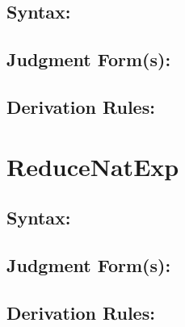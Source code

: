 \documentclass[11pt]{jarticle}
\begin{document}
\subsection*{Syntax:}

\EvalNatExpDisplayBNF

\subsection*{Judgment Form(s):}


\subsection*{Derivation Rules:}
\EvalNatExpDisplayRules

\newpage

\section*{ReduceNatExp}



\subsection*{Syntax:}

\ReduceNatExpDisplayBNF

\subsection*{Judgment Form(s):}

\subsection*{Derivation Rules:}
\ReduceNatExpDisplayRules
\end{document}
